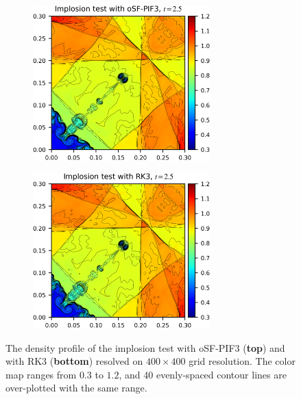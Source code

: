 \begin{figure}
    \centering
    \begin{subfigure}{\textwidth}
        \centering
        \includegraphics[width=0.75\textwidth]{fig/implosion_osf3.png}
    \end{subfigure}
    \par\bigskip
    \begin{subfigure}{\textwidth}
        \centering
        \includegraphics[width=0.75\textwidth]{fig/implosion_rk3.png}
    \end{subfigure}
    \caption{The density profile of the implosion test
        with oSF-PIF3 (\textbf{top}) and with RK3 (\textbf{bottom})
        resolved on \( 400 \times 400 \) grid resolution.
        The color map ranges from \( 0.3 \) to \( 1.2 \), and
        40 evenly-spaced contour lines are over-plotted with
        the same range.
    }\label{fig:implosion}
\end{figure}

